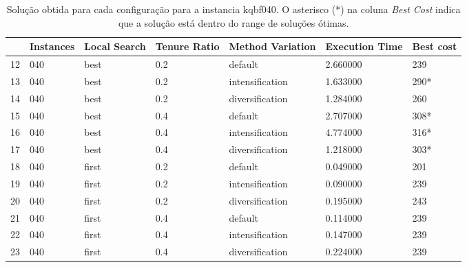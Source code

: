 \begin{table}
\centering
\begin{tabular}{lllllll}
\toprule
{} & Instances & Local Search & Tenure Ratio & Method Variation & Execution Time & Best cost \\
\midrule
12 &       040 &         best &          0.2 &          default &     2.660000 &       239 \\
13 &       040 &         best &          0.2 &  intensification &     1.633000 &       290* \\
14 &       040 &         best &          0.2 &  diversification &     1.284000 &       260 \\
15 &       040 &         best &          0.4 &          default &     2.707000 &       308* \\
16 &       040 &         best &          0.4 &  intensification &     4.774000 &       316* \\
17 &       040 &         best &          0.4 &  diversification &     1.218000 &       303* \\
18 &       040 &        first &          0.2 &          default &     0.049000 &       201 \\
19 &       040 &        first &          0.2 &  intensification &     0.090000 &       239 \\
20 &       040 &        first &          0.2 &  diversification &     0.195000 &       243 \\
21 &       040 &        first &          0.4 &          default &     0.114000 &       239 \\
22 &       040 &        first &          0.4 &  intensification &     0.147000 &       239 \\
23 &       040 &        first &          0.4 &  diversification &     0.224000 &       239 \\
\bottomrule
\end{tabular}
\caption{Solução obtida para cada configuração para a instancia kqbf040. O asterisco (*) na coluna \textit{Best Cost} indica que a solução está dentro do range de soluções ótimas.}
\label{table:all-data-1}
\end{table}

